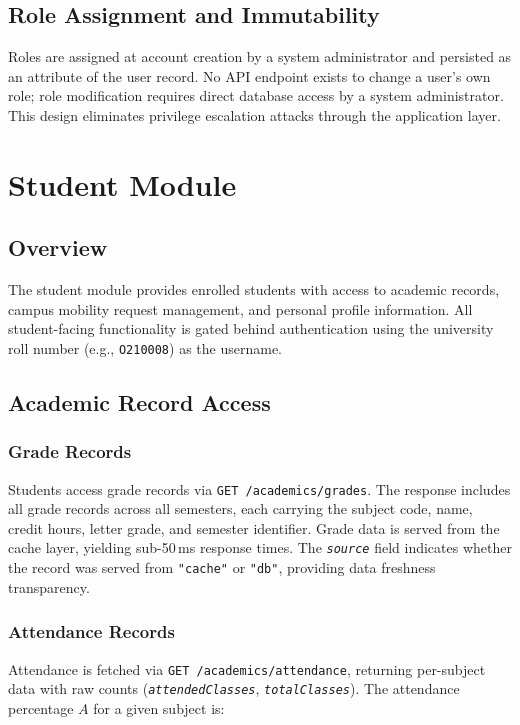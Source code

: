 \documentclass[12pt,a4paper]{report}
\newcommand{\api}[1]{\texttt{\small #1}}
\newcommand{\field}[1]{\texttt{\textit{#1}}}
\newcommand{\code}[1]{\texttt{#1}}
\begin{document}
\section{Role Assignment and Immutability}

Roles are assigned at account creation by a system administrator and persisted as an attribute of the user record. No API endpoint exists to change a user's own role; role modification requires direct database access by a system administrator. This design eliminates privilege escalation attacks through the application layer.

\chapter{Student Module}

\section{Overview}

The student module provides enrolled students with access to academic records, campus mobility request management, and personal profile information. All student-facing functionality is gated behind authentication using the university roll number (e.g., \code{O210008}) as the username.

\section{Academic Record Access}

\subsection{Grade Records}

Students access grade records via \api{GET /academics/grades}. The response includes all grade records across all semesters, each carrying the subject code, name, credit hours, letter grade, and semester identifier. Grade data is served from the cache layer, yielding sub-50\,ms response times. The \field{source} field indicates whether the record was served from \code{"cache"} or \code{"db"}, providing data freshness transparency.

\subsection{Attendance Records}

Attendance is fetched via \api{GET /academics/attendance}, returning per-subject data with raw counts (\field{attendedClasses}, \field{totalClasses}). The attendance percentage $A$ for a given subject is:
\end{document}
